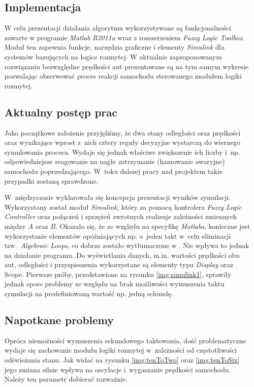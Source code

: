 \documentclass[11pt,a4paper]{article}
\begin{document}
\subsection{Implementacja}
W celu prezentacji działania algorytmu wykorzystywane są funkcjonalności zawarte w programie \emph{Matlab R2011a} wraz z rozszerzeniem \emph{Fuzzy Logic Toolbox}. Moduł ten zapewnia funkcje, narzędzia graficzne i elementy \emph{Simulink} dla systemów bazujących na logice rozmytej. W aktualnie zaproponowanym rozwiązaniu bezwzględne prędkości aut prezentowane są na tym samym wykresie pozwalając obserwować proces reakcji samochodu sterowanego modułem logiki rozmytej.

\subsection{Aktualny postęp prac}
Jako początkowe założenie przyjęliśmy, że dwa stany odległości oraz prędkości oraz wynikające wprost z~nich cztery reguły decyzyjne wystarczą do wiernego symulowania procesu. Wydaje się jednak właściwe zwiększenie ich liczby i~np. odpowiedniejsze reagowanie na nagłe zatrzymanie (hamowanie awaryjne) samochodu poprzedzającego. W~toku dalszej pracy nad projektem takie przypadki zostaną sprawdzone.

W~międzyczasie wyklarowała się koncepcja prezentacji wyników symulacji. Wykorzystany został moduł \emph{Simulink}, który za pomocą kontrolera \emph{Fuzzy Logic Controller} oraz połączeń i sprzężeń zwrotnych realizuje zależności zmiennych między $A$ oraz $B$. Okazało się, że ze względu na specyfikę \emph{Matlaba}, konieczne jest wykorzystanie elementów opóźniających np. o~jeden takt w~celu eliminacji tzw.~\emph{Algebraic Loops}, co dobrze zostało wytłumaczone w \cite{simulink}. Nie wpływa to jednak na działanie programu. Do wyświetlania danych, m.in. wartości prędkości obu aut, odległości i przyspieszenia wykorzystane są elementy typu \emph{Display} oraz {Scope}. Pierwsze próby, przedstawione na rysunku \ref{img:simulink1}, sprawiły jednak spore problemy ze względu na brak możliwości wymuszenia taktu symulacji na predefiniowaną wartość np. jedną sekundę.

\subsection{Napotkane problemy}
Oprócz niemożności wymuszenia sekundowego taktowania, dość problematyczne wydaje się zachowanie modułu logiki rozmytej w~zależności od częstotliwości odświeżania stanu. Jak widać na rysunku \ref{img:tenToTwo} oraz \ref{img:tenToSix} jego zmiana silnie wpływa na oscylacje i~wygaszanie prędkości samochodu. Należy ten parametr dobierać rozważnie.
\end{document}
